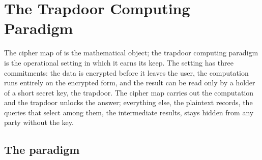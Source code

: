 %

\section{The Trapdoor Computing Paradigm}
\label{sec:trapdoor-paradigm}

The cipher map of  is the mathematical object; the
trapdoor computing paradigm is the operational setting in which it earns
its keep. The setting has three commitments: the data is encrypted before
it leaves the user, the computation runs entirely on the encrypted form,
and the result can be read only by a holder of a short secret key, the
trapdoor. The cipher map carries out the computation and the trapdoor
unlocks the answer; everything else, the plaintext records, the queries
that select among them, the intermediate results, stays hidden from any
party without the key.

\subsection*{The paradigm}

